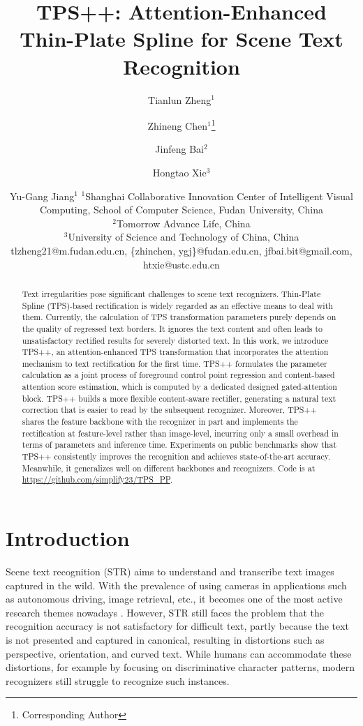 \documentclass{article}
\title{TPS++: Attention-Enhanced Thin-Plate Spline for Scene Text Recognition}
\author{
Tianlun Zheng$^1$
\and
Zhineng Chen$^1$\footnote{Corresponding Author}\and
Jinfeng Bai$^{2}$\and
Hongtao Xie$^3$\and
Yu-Gang Jiang$^1$
\affiliations
$^1$Shanghai Collaborative Innovation Center of Intelligent Visual Computing, School of Computer Science, Fudan University, China\\
$^2$Tomorrow Advance Life, China\\
$^3$University of Science and Technology of China, China\\
\emails
tlzheng21@m.fudan.edu.cn,
\{zhinchen, ygj\}@fudan.edu.cn,
jfbai.bit@gmail.com,
htxie@ustc.edu.cn
}
\begin{document}
\maketitle

\begin{abstract}
Text irregularities pose significant challenges to scene text recognizers. Thin-Plate Spline (TPS)-based rectification is widely regarded as an effective means to deal with them. Currently, the calculation of TPS transformation parameters purely depends on the quality of regressed text borders. It ignores the text content and often leads to unsatisfactory rectified results for severely distorted text. In this work, we introduce TPS++, an attention-enhanced TPS transformation that incorporates the attention mechanism to text rectification for the first time. TPS++ formulates the parameter calculation as a joint process of foreground control point regression and content-based attention score estimation, which is computed by a dedicated designed gated-attention block. TPS++ builds a more flexible content-aware rectifier, generating a natural text correction that is easier to read by the subsequent recognizer. Moreover, TPS++ shares the feature backbone with the recognizer in part and implements the rectification at feature-level rather than image-level, incurring only a small overhead in terms of parameters and inference time. Experiments on public benchmarks show that TPS++ consistently improves the recognition and achieves state-of-the-art accuracy. Meanwhile, it generalizes well on different backbones and recognizers. Code is at \url{https://github.com/simplify23/TPS_PP}.

\end{abstract}

\section{Introduction}
Scene text recognition (STR) aims to understand and transcribe text images captured in the wild. With the prevalence of using cameras in applications such as autonomous driving, image retrieval, etc., it becomes one of the most active research themes nowadays \cite{Baekwhats_wrong_19ICCV,long2021str_era,Chen2021text,du2022@svtr,wang2022petr}. However, STR still faces the problem that the recognition accuracy is not satisfactory for difficult text, partly because the text is not presented and captured in canonical, resulting in distortions such as perspective, orientation, and curved text. While humans can accommodate these distortions, for example by focusing on discriminative character patterns, modern recognizers still struggle to recognize such instances. 
\end{document}
